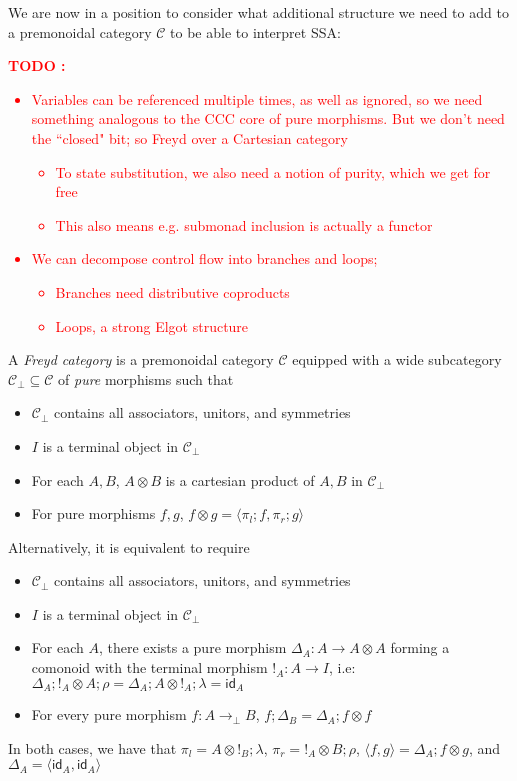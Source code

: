 \documentclass[acmsmall,screen,review]{acmart}
\newcounter{todos}
\newcommand{\TODO}[1]{{
  \stepcounter{todos}
  \begin{center}\large{\textcolor{red}{\textbf{TODO \arabic{todos}:} #1}}\end{center}
}}
\newcommand{\mc}[1]{\ensuremath{\mathcal{#1}}}
\newcommand{\ms}[1]{\ensuremath{\mathsf{#1}}}
\newcommand{\tmor}[1]{{!}_{#1}}
\newcommand{\dmor}[1]{{\Delta}_{#1}}
\begin{document}
We are now in a position to consider what additional structure we need to add to a premonoidal
category $\mc{C}$ to be able to interpret SSA:

\TODO{
  \begin{itemize}
    \item Variables can be referenced multiple times, as well as ignored, so we need something
    analogous to the CCC core of pure morphisms. But we don't need the ``closed" bit; so Freyd over
    a Cartesian category
    \begin{itemize}
      \item To state substitution, we also need a notion of purity, which we get for free
      \item This also means e.g. submonad inclusion is actually a functor
    \end{itemize}
    \item We can decompose control flow into branches and loops;
    \begin{itemize}
      \item Branches need distributive coproducts
      \item Loops, a strong Elgot structure
    \end{itemize}
  \end{itemize}
}

\begin{definition}
  A \emph{Freyd category} is a premonoidal category $\mc{C}$ equipped with a wide subcategory
  $\mc{C}_\bot \subseteq \mc{C}$ of \emph{pure} morphisms such that
  \begin{itemize}
    \item $\mc{C}_\bot$ contains all associators, unitors, and symmetries
    \item $I$ is a terminal object in $\mc{C}_\bot$
    \item For each $A, B$, $A \otimes B$ is a cartesian product of $A, B$ in $\mc{C}_\bot$
    \item For pure morphisms $f, g$, $f \otimes g = \langle \pi_l; f, \pi_r ; g  \rangle$
  \end{itemize}
  Alternatively, it is equivalent to require
  \begin{itemize}
    \item $\mc{C}_\bot$ contains all associators, unitors, and symmetries
    \item $I$ is a terminal object in $\mc{C}_\bot$
    \item For each $A$, there exists a pure morphism $\dmor{A} : A \to A \otimes A$ forming a
          comonoid with the terminal morphism $\tmor{A} : A \to I$, i.e: $\dmor{A} ; \tmor{A}
          \otimes A ; \rho = \dmor{A} ; A \otimes \tmor {A} ; \lambda = \ms{id}_A$
    \item For every pure morphism $f : A \to_\bot B$, $f ; \dmor{B} = \dmor{A} ; f \otimes f$
  \end{itemize}
  In both cases, we have that $\pi_l = A \otimes \tmor{B} ; \lambda$, $\pi_r = \tmor{A}
  \otimes B ; \rho$, $\langle f, g \rangle = \dmor{A} ; f \otimes g$, and $\dmor{A} = \langle
  \ms{id}_A, \ms{id}_A \rangle$
\end{definition}
\end{document}
